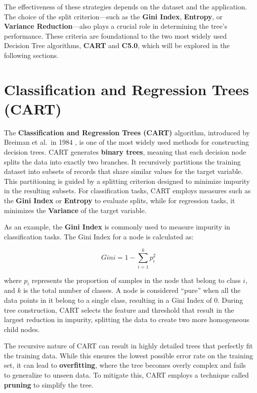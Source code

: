 \documentclass[
]{book}
\theoremstyle{definition}
\theoremstyle{definition}
\theoremstyle{definition}
\theoremstyle{definition}
\theoremstyle{remark}
\begin{document}
The effectiveness of these strategies depends on the dataset and the application. The choice of the split criterion---such as the \textbf{Gini Index}, \textbf{Entropy}, or \textbf{Variance Reduction}---also plays a crucial role in determining the tree's performance. These criteria are foundational to the two most widely used Decision Tree algorithms, \textbf{CART} and \textbf{C5.0}, which will be explored in the following sections.

\section{Classification and Regression Trees (CART)}\label{classification-and-regression-trees-cart}

The \textbf{Classification and Regression Trees (CART)} algorithm, introduced by Breiman et al.~in 1984 \citep{breiman1984classification}, is one of the most widely used methods for constructing decision trees. CART generates \textbf{binary trees}, meaning that each decision node splits the data into exactly two branches. It recursively partitions the training dataset into subsets of records that share similar values for the target variable. This partitioning is guided by a splitting criterion designed to minimize impurity in the resulting subsets. For classification tasks, CART employs measures such as the \textbf{Gini Index} or \textbf{Entropy} to evaluate splits, while for regression tasks, it minimizes the \textbf{Variance} of the target variable.

As an example, the \textbf{Gini Index} is commonly used to measure impurity in classification tasks. The Gini Index for a node is calculated as:

\[
Gini = 1 - \sum_{i=1}^k p_i^2
\]

where \(p_i\) represents the proportion of samples in the node that belong to class \(i\), and \(k\) is the total number of classes. A node is considered ``pure'' when all the data points in it belong to a single class, resulting in a Gini Index of 0. During tree construction, CART selects the feature and threshold that result in the largest reduction in impurity, splitting the data to create two more homogeneous child nodes.

The recursive nature of CART can result in highly detailed trees that perfectly fit the training data. While this ensures the lowest possible error rate on the training set, it can lead to \textbf{overfitting}, where the tree becomes overly complex and fails to generalize to unseen data. To mitigate this, CART employs a technique called \textbf{pruning} to simplify the tree.
\end{document}
